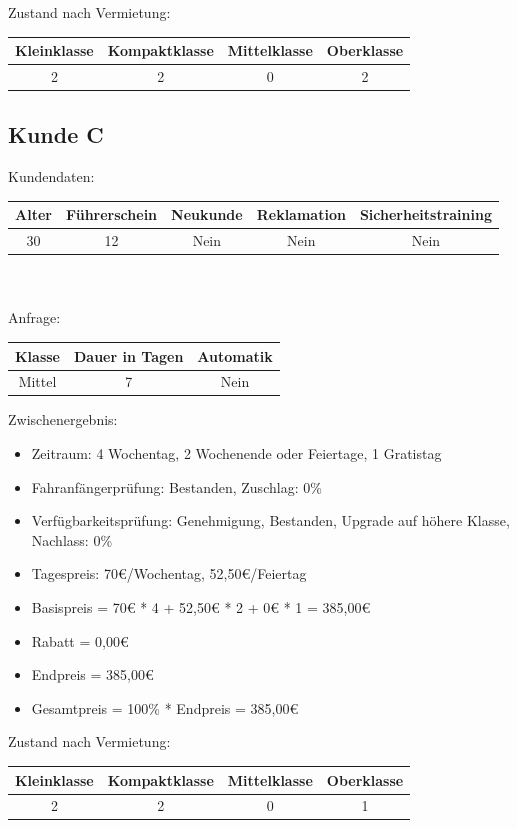 Zustand nach Vermietung:\\
\begin{tabular}{|c|c|c|c|}
	\hline \textbf{Kleinklasse} & \textbf{Kompaktklasse} & \textbf{Mittelklasse} & \textbf{Oberklasse}  \\ 
	\hline 2 & 2 & 0 & 2 \\ 
	\hline 
\end{tabular} 

\subsection{Kunde C}

Kundendaten:\\
\begin{tabular}{|c|c|c|c|c|}
	\hline \textbf{Alter} & \textbf{Führerschein} & \textbf{Neukunde} & \textbf{Reklamation} & \textbf{Sicherheitstraining} \\ 
	\hline 30 & 12 & Nein & Nein & Nein \\ 
	\hline 
\end{tabular} 
\\\\
Anfrage:\\
\begin{tabular}{|c|c|c|}
	\hline \textbf{Klasse} & \textbf{Dauer in Tagen} & \textbf{Automatik} \\ 
	\hline Mittel & 7 & Nein \\ 
	\hline 
\end{tabular}

Zwischenergebnis:
\begin{itemize}
	\item Zeitraum: 4 Wochentag, 2 Wochenende oder Feiertage, 1 Gratistag
	\item Fahranfängerprüfung: Bestanden, Zuschlag: 0\%
	\item Verfügbarkeitsprüfung: Genehmigung, Bestanden, Upgrade auf höhere Klasse, Nachlass: 0\%
	\item Tagespreis: 70€/Wochentag, 52,50€/Feiertag
	\item Basispreis = 70€ * 4 + 52,50€ * 2 + 0€ * 1 = 385,00€
	\item Rabatt = 0,00€
	\item Endpreis = 385,00€
	\item Gesamtpreis = 100\% * Endpreis = 385,00€
\end{itemize}

Zustand nach Vermietung:\\
\begin{tabular}{|c|c|c|c|}
	\hline \textbf{Kleinklasse} & \textbf{Kompaktklasse} & \textbf{Mittelklasse} & \textbf{Oberklasse}  \\ 
	\hline 2 & 2 & 0 & 1 \\ 
	\hline 
\end{tabular} 

